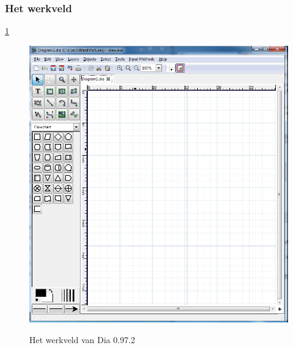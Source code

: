 \documentclass[12pt,a4paper]{report}
\begin{document}
\begin{flushleft}
\subsubsection{Het werkveld}\ref{werkveld_01}
\begin{figure}[H]
\includegraphics[scale=0.5]{images/werkveld_01.png}
\label{werkveld_01}
\centering 
\vspace{-10pt}
\caption{Het werkveld van Dia 0.97.2}
\end{figure}

\end{flushleft}
\end{document}
